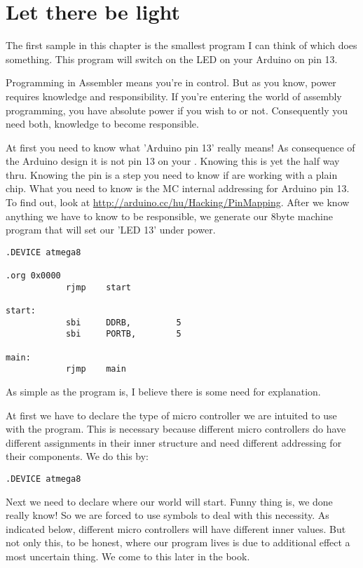 \section{Let there be light}

The first sample in this chapter is the smallest program I can think of which does something.
This program will switch on the LED on your Arduino on pin 13.

Programming in Assembler means you're in control. But as you know, power requires knowledge and responsibility. If you're entering the world of assembly programming, you have absolute power if you wish to or not. Consequently you need both, knowledge to become responsible.

At first you need to know what 'Arduino pin 13' really means! As consequence of the Arduino design it is not pin 13 on your \at. Knowing this is yet the half way thru. Knowing the pin is a step you need to know if are working with a plain chip. What you need to know is the MC internal addressing for Arduino pin 13. To find out, look at \url{http://arduino.cc/hu/Hacking/PinMapping}. After we know anything we have to know to be responsible, we generate our 8byte machine program that will set our 'LED 13' under power.

\begin{lstlisting}
.DEVICE atmega8

.org 0x0000
            rjmp    start 

start:
            sbi     DDRB,         5
            sbi     PORTB,        5
            
main:
            rjmp    main
\end{lstlisting}

As simple as the program is, I believe there is some need for explanation.

At first we have to declare the type of micro controller we are intuited to use with the program. This is necessary because different micro controllers do have different assignments in their inner structure and need different addressing for their components. We do this by:

\begin{lstlisting}
.DEVICE atmega8
\end{lstlisting}

Next we need to declare where our world will start. Funny thing is, we done really know! So we are forced to use symbols to deal with this necessity. As indicated below, different micro controllers will have different inner values. But not only this, to be honest, where our program lives is due to additional effect a most uncertain thing. We come to this later in the book.

